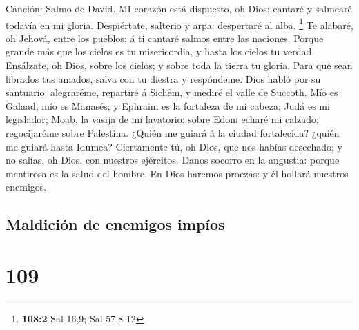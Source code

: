  Canción: Salmo de David. MI corazón está dispuesto, oh
Dios; cantaré y salmearé todavía en mi gloria.  Despiértate,
salterio y arpa: despertaré al alba. \footnote{\textbf{108:2} Sal 16,9;
  Sal 57,8-12}  Te alabaré, oh Jehová, entre los pueblos; á
ti cantaré salmos entre las naciones.  Porque grande más que
los cielos es tu misericordia, y hasta los cielos tu verdad.
 Ensálzate, oh Dios, sobre los cielos; y sobre toda la
tierra tu gloria.  Para que sean librados tus amados, salva
con tu diestra y respóndeme.  Dios habló por su santuario:
alegraréme, repartiré á Sichêm, y mediré el valle de Succoth.
 Mío es Galaad, mío es Manasés; y Ephraim es la fortaleza de
mi cabeza; Judá es mi legislador;  Moab, la vasija de mi
lavatorio: sobre Edom echaré mi calzado; regocijaréme sobre Palestina.
 ¿Quién me guiará á la ciudad fortalecida? ¿quién me guiará
hasta Idumea?  Ciertamente tú, oh Dios, que nos habías
desechado; y no salías, oh Dios, con nuestros ejércitos. 
Danos socorro en la angustia: porque mentirosa es la salud del hombre.
 En Dios haremos proezas: y él hollará nuestros enemigos.

\hypertarget{maldiciuxf3n-de-enemigos-impuxedos}{%
\subsection{Maldición de enemigos
impíos}\label{maldiciuxf3n-de-enemigos-impuxedos}}

\hypertarget{section-108}{%
\section{109}\label{section-108}}

